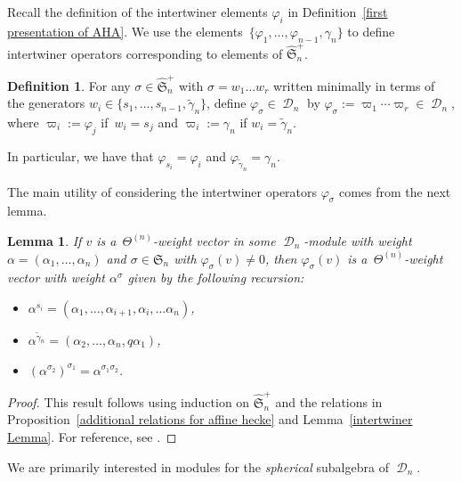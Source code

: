 \documentclass[pdftex]{sigma}
\numberwithin{equation}{section}
\newtheorem{Lemma}[Theorem]{Lemma}
\theoremstyle{definition}
\newtheorem{Definition}[Theorem]{Definition}
\DeclareMathOperator{\sD}{\mathscr{D}}
\begin{document}
Recall the definition of the intertwiner elements $\varphi_i$ in Definition~\ref{first presentation of AHA}. We use the elements~${\{\varphi_1,\dots, \varphi_{n-1}, \gamma_n\}}$ to define intertwiner operators corresponding to elements of $\widehat{\mathfrak{S}}_n^{+}$.

\begin{Definition}\label{intertwiners def}
 For any $\sigma \in \widehat{\mathfrak{S}}_n^{+}$ with $
 \sigma = w_1\dots w_r$ written minimally in terms of the generators $w_i \in \{s_1,\dots, s_{n-1},\widetilde{\gamma}_n \}$, define $\varphi_{\sigma} \in \sD_n$ by
$ \varphi_{\sigma}:= \varpi_1\cdots \varpi_r \in \sD_n
$, where $\varpi_i:= \varphi_j$ if~${w_i = s_j}$ and $\varpi_{i} := \gamma_n$ if $w_i = \widetilde{\gamma}_n$.

In particular, we have that $\varphi_{s_i} = \varphi_{i}$ and $\varphi_{\widetilde{\gamma}_n} = \gamma_n$.
\end{Definition}

The main utility of considering the intertwiner operators $\varphi_{\sigma}$ comes from the next lemma.

\begin{Lemma}\label{weight vector intertwiners Lemma}
 If $v$ is a~$\Theta^{(n)}$-weight vector in some $\sD_n$-module with weight $\alpha= (\alpha_1,\dots,\alpha_n)$ and $\sigma \in \mathfrak{S}_n$ with $\varphi_{\sigma}(v) \neq 0$, then $\varphi_{\sigma}(v)$ is a~$\Theta^{(n)}$-weight vector with weight $\alpha^{\sigma}$ given by the following recursion:
 \begin{itemize}
\itemsep=0pt
 \item $\alpha^{s_i} = (\alpha_1,\dots,\alpha_{i+1},\alpha_i,\dots\alpha_n)$,
 \item $\alpha^{\widetilde{\gamma}_n} = (\alpha_2,\dots, \alpha_{n}, q\alpha_1)$,
 \item $(\alpha^{\sigma_2})^{\sigma_1} = \alpha^{\sigma_1\sigma_2}$.
 \end{itemize}
\end{Lemma}
\begin{proof}
 This result follows using induction on $\widehat{\mathfrak{S}}_n^{+}$ and the relations in Proposition~\ref{additional relations for affine hecke} and Lemma~\ref{intertwiner Lemma}. For reference, see \cite[Section~3.3.3]{CherednikBook}.
\end{proof}

We are primarily interested in modules for the \textit{spherical} subalgebra of $\sD_n$.
\end{document}
